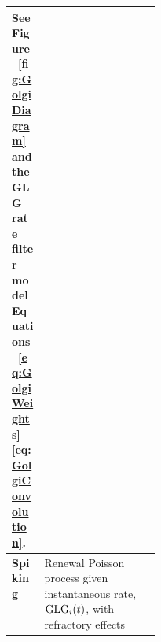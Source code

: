 {\begin{table}[!tp]
\begin{tabularx}{\linewidth}{|p{0.22\linewidth}|X|}
See Figure~\ref{fig:GolgiDiagram} and the GLG rate filter model
Equations~\ref{eq:GolgiWeights}--\ref{eq:GolgiConvolution}.
\\\hline
 \textbf{Spiking} & Renewal Poisson process given instantaneous rate, ${\rm GLG}_{i}(t)$,  with refractory effects  \citep{ZilanyBruce:2007,Jackson:2003} \\\hline
\end{tabularx}
\vspace{2ex} 


\end{table}}
